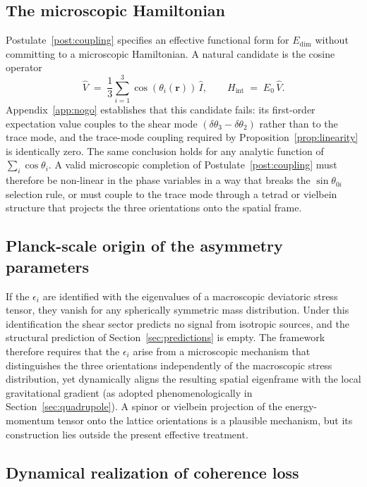 \documentclass[a4paper,fleqn]{cas-dc}
\theoremstyle{thmstyleone}%
\theoremstyle{thmstyletwo}%
\begin{document}
\subsection{The microscopic Hamiltonian}

Postulate~\ref{post:coupling} specifies an effective functional
form for $E_{\mathrm{dim}}$ without committing to a
microscopic Hamiltonian. A natural candidate is the cosine
operator
\begin{equation}
    \hat{V}
    \;=\;
    \frac{1}{3}\sum_{i=1}^{3}\cos(\theta_i(\mathbf{r}))\,\hat{I},
    \qquad
    H_{\mathrm{int}}\;=\;E_0\,\hat{V}.
    \label{eq:cosine_H}
\end{equation}
Appendix~\ref{app:nogo} establishes that this candidate fails:
its first-order expectation value couples to the shear mode
$(\delta\theta_3-\delta\theta_2)$ rather than to the trace
mode, and the trace-mode coupling required by
Proposition~\ref{prop:linearity} is identically zero. The
same conclusion holds for any analytic function of
$\sum_i\cos\theta_i$. A valid microscopic completion of
Postulate~\ref{post:coupling} must therefore be non-linear in
the phase variables in a way that breaks the $\sin\theta_{0i}$
selection rule, or must couple to the trace mode through a
tetrad or vielbein structure that projects the three
orientations onto the spatial frame.

\subsection{Planck-scale origin of the asymmetry parameters}

If the $\epsilon_i$ are identified with the eigenvalues of a
macroscopic deviatoric stress tensor, they vanish for any
spherically symmetric mass distribution. Under this
identification the shear sector predicts no signal from
isotropic sources, and the structural prediction of
Section~\ref{sec:predictions} is empty. The framework
therefore requires that the $\epsilon_i$ arise from a
microscopic mechanism that distinguishes the three
orientations independently of the macroscopic stress
distribution, yet dynamically aligns the resulting spatial 
eigenframe with the local gravitational gradient (as adopted 
phenomenologically in Section~\ref{sec:quadrupole}). A spinor 
or vielbein projection of the energy-momentum tensor onto the 
lattice orientations is a plausible mechanism, but its 
construction lies outside the present effective treatment.

\subsection{Dynamical realization of coherence loss}
\end{document}
